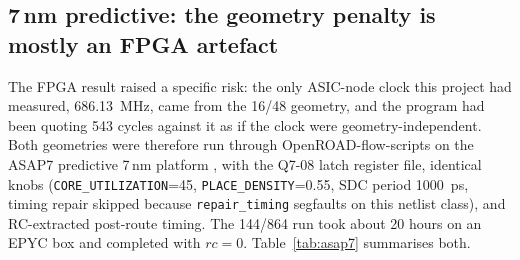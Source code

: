 \subsection*{7\,nm predictive: the geometry penalty is mostly an FPGA artefact}

The FPGA result raised a specific risk: the only ASIC-node clock this project
had measured, \SI{686.13}{\mega\hertz}, came from the 16/48 geometry, and the
program had been quoting 543 cycles against it as if the clock were
geometry-independent.
Both geometries were therefore run through OpenROAD-flow-scripts
\citep{openroad} on the ASAP7 predictive 7\,nm platform \citep{clark2016asap7},
with the Q7-08 latch register file, identical knobs
(\texttt{CORE\_UTILIZATION}=45, \texttt{PLACE\_DENSITY}=0.55, SDC period
\SI{1000}{\pico\second}, timing repair skipped because \texttt{repair\_timing}
segfaults on this netlist class), and RC-extracted post-route timing. The
144/864 run took about 20 hours on an EPYC box and completed with $rc=0$.
Table~\ref{tab:asap7} summarises both.

